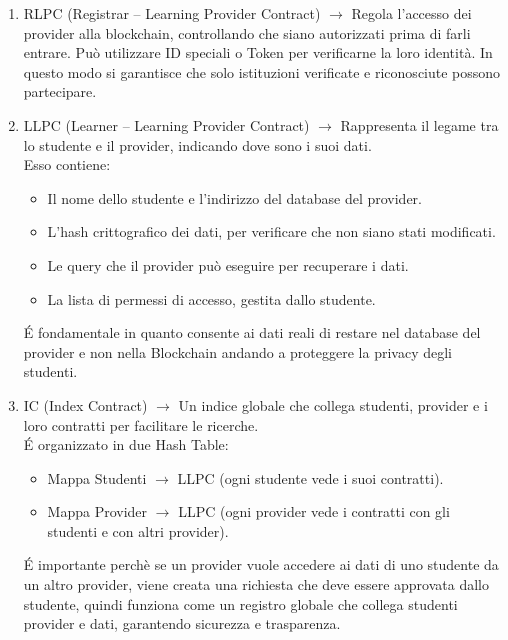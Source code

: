 \begin{enumerate}
    \item RLPC (Registrar – Learning Provider Contract) $\rightarrow$ Regola l’accesso dei provider alla blockchain, controllando che siano autorizzati prima di farli entrare. Può utilizzare ID speciali o Token per verificarne la loro identità. In questo modo si garantisce che solo istituzioni verificate e riconosciute possono partecipare.
    \item LLPC (Learner – Learning Provider Contract) $\rightarrow$ Rappresenta il legame tra lo studente e il provider, indicando dove sono i suoi dati.
          \\Esso contiene:
            \begin{itemize}
                \item Il nome dello studente e l'indirizzo del database del provider.
                \item L’hash crittografico dei dati, per verificare che non siano stati modificati.
                \item Le query che il provider può eseguire per recuperare i dati.
                \item La lista di permessi di accesso, gestita dallo studente.
            \end{itemize}
            \'E fondamentale in quanto consente ai dati reali di restare nel database del provider e non nella Blockchain andando a proteggere la privacy degli studenti.
    \item IC (Index Contract) $\rightarrow$ Un indice globale che collega studenti, provider e i loro contratti per facilitare le ricerche.
            \\\'E organizzato in due Hash Table:
            \begin{itemize}
                \item Mappa Studenti $\rightarrow$ LLPC (ogni studente vede i suoi contratti).
                \item Mappa Provider $\rightarrow$ LLPC (ogni provider vede i contratti con gli studenti e con altri provider).
            \end{itemize}
            \'E importante perchè se un provider vuole accedere ai dati di uno studente da un altro provider, viene creata una richiesta che deve essere approvata dallo studente, quindi funziona come un registro globale che collega studenti provider e dati, garantendo sicurezza e trasparenza.
\end{enumerate}